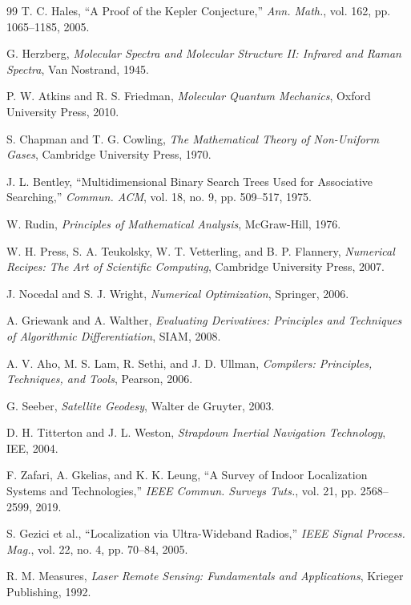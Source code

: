 \documentclass[twocolumn,10pt,a4paper]{article}
\theoremstyle{definition}
\theoremstyle{remark}
\begin{document}
\begin{thebibliography}{99}
T. C. Hales,
``A Proof of the Kepler Conjecture,''
\textit{Ann. Math.}, vol. 162, pp. 1065--1185, 2005.

G. Herzberg,
\textit{Molecular Spectra and Molecular Structure II: Infrared and Raman Spectra},
Van Nostrand, 1945.

P. W. Atkins and R. S. Friedman,
\textit{Molecular Quantum Mechanics},
Oxford University Press, 2010.

S. Chapman and T. G. Cowling,
\textit{The Mathematical Theory of Non-Uniform Gases},
Cambridge University Press, 1970.

J. L. Bentley,
``Multidimensional Binary Search Trees Used for Associative Searching,''
\textit{Commun. ACM}, vol. 18, no. 9, pp. 509--517, 1975.

W. Rudin,
\textit{Principles of Mathematical Analysis},
McGraw-Hill, 1976.

W. H. Press, S. A. Teukolsky, W. T. Vetterling, and B. P. Flannery,
\textit{Numerical Recipes: The Art of Scientific Computing},
Cambridge University Press, 2007.

J. Nocedal and S. J. Wright,
\textit{Numerical Optimization},
Springer, 2006.

A. Griewank and A. Walther,
\textit{Evaluating Derivatives: Principles and Techniques of Algorithmic Differentiation},
SIAM, 2008.

A. V. Aho, M. S. Lam, R. Sethi, and J. D. Ullman,
\textit{Compilers: Principles, Techniques, and Tools},
Pearson, 2006.

G. Seeber,
\textit{Satellite Geodesy},
Walter de Gruyter, 2003.

D. H. Titterton and J. L. Weston,
\textit{Strapdown Inertial Navigation Technology},
IEE, 2004.

F. Zafari, A. Gkelias, and K. K. Leung,
``A Survey of Indoor Localization Systems and Technologies,''
\textit{IEEE Commun. Surveys Tuts.}, vol. 21, pp. 2568--2599, 2019.

S. Gezici et al.,
``Localization via Ultra-Wideband Radios,''
\textit{IEEE Signal Process. Mag.}, vol. 22, no. 4, pp. 70--84, 2005.

R. M. Measures,
\textit{Laser Remote Sensing: Fundamentals and Applications},
Krieger Publishing, 1992.


\end{thebibliography}
\end{document}
